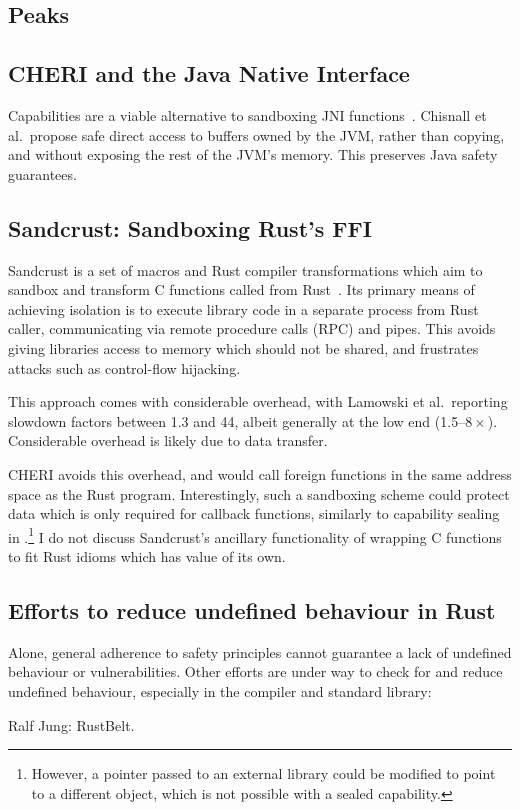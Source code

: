 \documentclass[dissertation.tex]{subfiles}
\begin{document}
\subsection{Peaks}
\label{sec:rel-peaks}



\subsection{CHERI and the Java Native Interface}
\label{sec:rel-cheri-jni}

Capabilities are a viable alternative to sandboxing JNI
functions~\cite{cheri-jni}.
Chisnall et al.\ propose safe direct access to buffers owned by the JVM,
rather than copying, and without exposing the rest of the JVM's memory.
This preserves Java safety guarantees.


\subsection{Sandcrust: Sandboxing Rust's FFI}
\label{sec:rel-sandcrust}

Sandcrust is a set of macros and Rust compiler transformations which aim
to sandbox and transform C functions called from
Rust~\cite{lamowski-sandcrust}.
Its primary means of achieving isolation is to execute library code in a
separate process from Rust caller, communicating via remote procedure
calls (RPC) and pipes.
This avoids giving libraries access to memory which should not be
shared, and frustrates attacks such as control-flow hijacking.

This approach comes with considerable overhead, with Lamowski et al.\
reporting slowdown factors between 1.3 and 44, albeit generally at the
low end (1.5--\(8\times\)).
Considerable overhead is likely due to data transfer.

CHERI avoids this overhead, and would call foreign functions in the same
address space as the Rust program.
Interestingly, such a sandboxing scheme could protect data which is only
required for callback functions, similarly to capability sealing in
\Cref{sec:eval-rust-xprocess}.\footnote{
    However, a pointer passed to an external library could be modified
    to point to a different object, which is not possible with a sealed
    capability.
}
I do not discuss Sandcrust's ancillary functionality of wrapping C
functions to fit Rust idioms which has value of its own.


\subsection{Efforts to reduce undefined behaviour in Rust}
Alone, general adherence to safety principles cannot guarantee a lack of
undefined behaviour or vulnerabilities.
Other efforts are under way to check for and reduce undefined behaviour,
especially in the compiler and standard library:

Ralf Jung: RustBelt.
\end{document}

